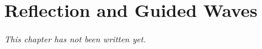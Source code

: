 \chapter{Reflection and Guided Waves}\label{ch:b2:guided-waves}


\emph{This chapter has not been written yet.}
